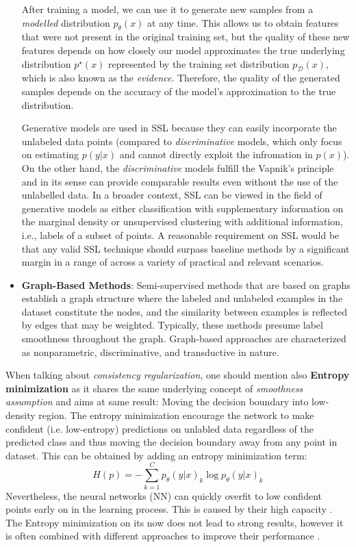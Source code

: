 \begin{itemize}
        After training a model, we can use it to generate new samples from a \textit{modelled} distribution $p_\theta(x)$ at any time. 
        This allows us to obtain features that were not present in the original training set, but the quality of these new features depends on
        how closely our model approximates the true underlying distribution $p^\star(x)$ represented by the training set distribution 
        $p_{\mathcal{D}}(x)$, which is also known as the \textit{evidence}. Therefore, the quality of the generated samples depends on the 
        accuracy of the model's approximation to the true distribution.

        Generative models are used in SSL because they can easily incorporate the unlabeled data points (compared to \textit{discriminative} models, which only focus on estimating
        $p(y|x)$ and cannot directly exploit the infromation in $p(x)$). On the other hand, the \textit{discriminative} models fulfill the Vapnik's principle and in its
        sense can provide comparable results even without the use of the unlabelled data.  In a broader context, SSL can be viewed in the field of generative models as 
        either classification with supplementary information on the marginal density or unsupervised clustering with additional information, i.e., labels of a subset 
        of points. A reasonable requirement on SSL would be that any valid SSL technique should surpass baseline methods by a significant margin in a range of across a
        variety of practical and relevant scenarios. 
    \item \textbf{Graph-Based Methods}:
    Semi-supervised methods that are based on graphs establish a graph structure where the labeled and unlabeled examples in the dataset constitute the nodes, and the 
    similarity between examples is reflected by edges that may be weighted. Typically, these methods presume label smoothness throughout the graph. Graph-based 
    approaches are characterized as nonparametric, discriminative, and transductive in nature\cite{another-survey-2008}.
\end{itemize}

When talking about \textit{consistency regularization}, one should mention also \textbf{Entropy minimization}\cite{entropy-min-2004} as it shares the same underlying concept
of \textit{smoothness assumption} and aims at same result: Moving the decision boundary into low-density region. The entropy minimization encourage the 
network to make confident (i.e. low-entropy) predictions on unlabled data regardless of the predicted class and thus moving the decision boundary away from any point in dataset.
This can be obtained by adding an entropy minimization term:
\begin{equation*}
    H(p) = -\sum_{k=1}^{C} p_\theta(y|x)_k \log p_\theta(y|x)_k
\end{equation*}
Nevertheless, the neural networks (NN) can quickly overfit to low confident points early on in the learning process. This is caused by their high capacity \cite{how-to-evalute-ssl-2018}.
The Entropy minimization on its now does not lead to strong results, however it is often combined with different approaches to improve their performance \cite{ssl-overview-2020}.

